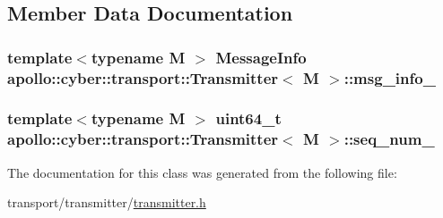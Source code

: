 \subsection{Member Data Documentation}
\hypertarget{classapollo_1_1cyber_1_1transport_1_1Transmitter_a21d38f3801379a33ed3d032b5c092763}{
\subsubsection[{msg\-\_\-info\-\_\-}]{\setlength{\rightskip}{0pt plus 5cm}template$<$typename M $>$ {\bf Message\-Info} {\bf apollo\-::cyber\-::transport\-::\-Transmitter}$<$ M $>$\-::msg\-\_\-info\-\_\-\hspace{0.3cm}{\ttfamily [protected]}}}\label{classapollo_1_1cyber_1_1transport_1_1Transmitter_a21d38f3801379a33ed3d032b5c092763}
\hypertarget{classapollo_1_1cyber_1_1transport_1_1Transmitter_a4250ef0529279ee67dfa47ef4b9e2e3c}{
\subsubsection[{seq\-\_\-num\-\_\-}]{\setlength{\rightskip}{0pt plus 5cm}template$<$typename M $>$ uint64\-\_\-t {\bf apollo\-::cyber\-::transport\-::\-Transmitter}$<$ M $>$\-::seq\-\_\-num\-\_\-\hspace{0.3cm}{\ttfamily [protected]}}}\label{classapollo_1_1cyber_1_1transport_1_1Transmitter_a4250ef0529279ee67dfa47ef4b9e2e3c}


The documentation for this class was generated from the following file\-:\begin{DoxyCompactItemize}
\item 
transport/transmitter/\hyperlink{transmitter_8h}{transmitter.\-h}\end{DoxyCompactItemize}
